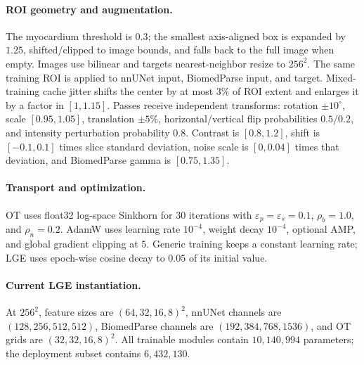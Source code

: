 \documentclass[10pt]{article}
\begin{document}
\paragraph{ROI geometry and augmentation.}
The myocardium threshold is $0.3$; the smallest axis-aligned box is expanded by
$1.25$, shifted/clipped to image bounds, and falls back to the full image when
empty.  Images use bilinear and targets nearest-neighbor resize to $256^2$.
The same training ROI is applied to nnUNet input, BiomedParse input, and target.
Mixed-training cache jitter shifts the center by at most $3\%$ of ROI extent and
enlarges it by a factor in $[1,1.15]$.  Passes receive independent transforms:
rotation $\pm10^\circ$, scale $[0.95,1.05]$, translation $\pm5\%$,
horizontal/vertical flip probabilities $0.5/0.2$, and intensity perturbation
probability $0.8$.  Contrast is $[0.8,1.2]$, shift is $[-0.1,0.1]$ times slice
standard deviation, noise scale is $[0,0.04]$ times that deviation, and
BiomedParse gamma is $[0.75,1.35]$.

\paragraph{Transport and optimization.}
OT uses float32 log-space Sinkhorn for $30$ iterations with
$\varepsilon_p=\varepsilon_s=0.1$, $\rho_b=1.0$, and $\rho_n=0.2$.
AdamW uses learning rate $10^{-4}$, weight decay $10^{-4}$, optional AMP, and
global gradient clipping at $5$.  Generic training keeps a constant learning
rate; LGE uses epoch-wise cosine decay to $0.05$ of its initial value.

\paragraph{Current LGE instantiation.}
At $256^2$, feature sizes are $(64,32,16,8)^2$, nnUNet channels are
$(128,256,512,512)$, BiomedParse channels are $(192,384,768,1536)$, and OT
grids are $(32,32,16,8)^2$.  All trainable modules contain
$10{,}140{,}994$ parameters; the deployment subset contains $6{,}432{,}130$.
\end{document}
